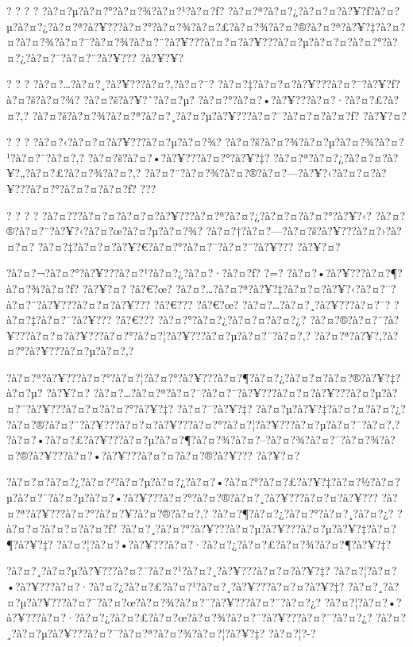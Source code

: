 \documentclass[11pt, openany]{book}
\begin{document}
{{{{{{{{{{? ? ? ? ?à?¤?µ?à?¤?°?à?¤?¾?à?¤?¹?à?¤?ƒ?
?à?¤?ª?à?¤?¿?à?¤?¤?à?¥?ƒ?à?¤?µ?à?¤?¿?à?¤?ª?à?¥???à?¤?°?à?¤?¾?à?¤?£?à?¤?¾?à?¤?®?à?¤?ª?à?¥?‡?à?¤?¤?à?¤?¾?à?¤?¯?à?¤?¾?à?¤?¨?à?¥???à?¤?¤?à?¥???à?¤?µ?à?¤?¤?à?¤?°?à?¤?¿?à?¤?¯?à?¤?¨?à?¥???
?à?¥?¥?

? ? ? ?à?¤?\ldots{}?à?¤?¸?à?¥???à?¤?‚?à?¤?¯?
?à?¤?‡?à?¤?¤?à?¥???à?¤?¯?à?¥?ƒ?à?¤?š?à?¤?¾? ?à?¤?š?à?¥?ˆ?à?¤?µ?
?à?¤?°?à?¤?•?à?¥???à?¤?·?à?¤?£?à?¤?‚?
?à?¤?š?à?¤?¾?à?¤?ª?à?¤?¸?à?¤?µ?à?¥???à?¤?¯?à?¤?¤?à?¤?ƒ? ?à?¥?¤?

? ? ? ?à?¤?‹?à?¤?¤?à?¥???à?¤?µ?à?¤?¾?
?à?¤?š?à?¤?¾?à?¤?µ?à?¤?¾?à?¤?¹?à?¤?¨?à?¤?‚?
?à?¤?š?à?¤?•?à?¥???à?¤?°?à?¥?‡?
?à?¤?ª?à?¤?¿?à?¤?¤?à?¥?„?à?¤?£?à?¤?¾?à?¤?‚?
?à?¤?¨?à?¤?¾?à?¤?®?à?¤?---?à?¥?‹?à?¤?¤?à?¥???à?¤?°?à?¤?¤?à?¤?ƒ?
?\textbar{}?\textbar{}?

? ? ? ? ?à?¤???à?¤?¤?à?¤?¤?à?¥???à?¤?ª?à?¤?¿?à?¤?¤?à?¤?°?à?¥?‹?
?à?¤?®?à?¤?¨?à?¥?‹?à?¤?œ?à?¤?µ?à?¤?¾?
?à?¤?†?à?¤?---?à?¤?š?à?¥???à?¤?›?à?¤?¤?
?à?¤?‡?à?¤?¤?à?¥?€?à?¤?°?à?¤?¯?à?¤?¨?à?¥??? ?à?¥?¤?

?à?¤?¬?à?¤?°?à?¥???à?¤?¹?à?¤?¿?à?¤?·?à?¤?ƒ? ?=?
?à?¤?•?à?¥???à?¤?¶?à?¤?¾?à?¤?ƒ? ?à?¥?¤? ?â?€?œ?
?à?¤?\ldots{}?à?¤?ª?à?¥?‡?à?¤?¤?à?¥?‹?à?¤?¯?à?¤?¨?à?¥???à?¤?¤?à?¥???
?â?€??? ?â?€?œ? ?à?¤?\ldots{}?à?¤?¸?à?¥???à?¤?¯? ?à?¤?‡?à?¤?¯?à?¥???
?â?€??? ?à?¤?°?à?¤?¿?à?¤?¤?à?¤?¿?
?à?¤?®?à?¤?¨?à?¥???à?¤?¤?à?¥???à?¤?°?à?¤?¦?à?¥???à?¤?µ?à?¤?¯?à?¤?‚?
?à?¤?ª?à?¥?‚?à?¤?°?à?¥???à?¤?µ?à?¤?‚?

?à?¤?ª?à?¥???à?¤?°?à?¤?¦?à?¤?°?à?¥???à?¤?¶?à?¤?¿?à?¤?¤?à?¤?®?à?¥?‡?à?¤?µ?
?à?¥?¤?
?à?¤?\ldots{}?à?¤?ª?à?¤?¯?à?¤?¨?à?¥???à?¤?¤?à?¥???à?¤?µ?à?¤?¨?à?¥???à?¤?¤?à?¤?°?à?¥?‡?
?à?¤?¯?à?¥?‡? ?à?¤?µ?à?¥?‡?à?¤?¤?à?¤?¿?
?à?¤?®?à?¤?¨?à?¥???à?¤?¤?à?¥???à?¤?°?à?¤?¦?à?¥???à?¤?µ?à?¤?¯?à?¤?‚?
?à?¤?•?à?¤?£?à?¥???à?¤?µ?à?¤?¶?à?¤?¾?à?¤?--?à?¤?¾?à?¤?¯?à?¤?¾?à?¤?®?à?¥???à?¤?•?à?¥???à?¤?¤?à?¤?®?à?¥???
?à?¥?¤?

?à?¤?¤?à?¤?¿?à?¤?²?à?¤?µ?à?¤?¿?à?¤?•?à?¤?°?à?¤?£?à?¥?‡?à?¤?½?à?¤?µ?à?¤?¯?à?¤?µ?à?¤?•?à?¥???à?¤?°?à?¤?®?à?¤?¸?à?¥???à?¤?¤?à?¥???
?à?¤?ª?à?¥???à?¤?°?à?¤?¥?à?¤?®?à?¤?‚? ?à?¤?¶?à?¤?¿?à?¤?°?à?¤?¸?à?¤?¿?
?à?¤?¤?à?¤?¤?à?¤?ƒ?
?à?¤?¸?à?¤?°?à?¥???à?¤?µ?à?¥???à?¤?µ?à?¥?‡?à?¤?¶?à?¥?‡?
?à?¤?¦?à?¤?•?à?¥???à?¤?·?à?¤?¿?à?¤?£?à?¤?¾?à?¤?¶?à?¥?‡?

?à?¤?¸?à?¤?µ?à?¥???à?¤?¯?à?¤?¹?à?¤?¸?à?¥???à?¤?¤?à?¥?‡?
?à?¤?¦?à?¤?•?à?¥???à?¤?·?à?¤?¿?à?¤?£?à?¤?¹?à?¤?¸?à?¥???à?¤?¤?à?¥?‡?
?à?¤?¸?à?¤?µ?à?¥???à?¤?¯?à?¤?œ?à?¤?¾?à?¤?¨?à?¥???à?¤?¨?à?¤?¿?
?à?¤?¦?à?¤?•?à?¥???à?¤?·?à?¤?¿?à?¤?£?à?¤?œ?à?¤?¾?à?¤?¨?à?¥???à?¤?¨?à?¤?¿?
?à?¤?¸?à?¤?µ?à?¥???à?¤?¯?à?¤?ª?à?¤?¾?à?¤?¦?à?¥?‡? ?à?¤?¦?-?

}}}}}}}}}}
\end{document}
